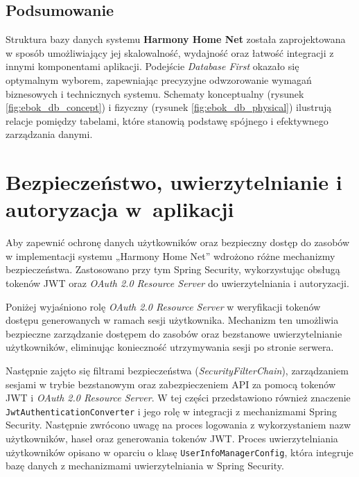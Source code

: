 \subsection{Podsumowanie}

Struktura bazy danych systemu \textbf{Harmony Home Net} została zaprojektowana w sposób umożliwiający jej skalowalność, wydajność oraz łatwość integracji z innymi komponentami aplikacji. Podejście \emph{Database First} okazało się optymalnym wyborem, zapewniając precyzyjne odwzorowanie wymagań biznesowych i technicznych systemu. Schematy konceptualny (rysunek \ref{fig:ebok_db_concept}) i fizyczny (rysunek \ref{fig:ebok_db_physical}) ilustrują relacje pomiędzy tabelami, które stanowią podstawę spójnego i efektywnego zarządzania danymi.

\section{Bezpieczeństwo, uwierzytelnianie i autoryzacja w~aplikacji}
Aby zapewnić ochronę danych użytkowników oraz bezpieczny dostęp do zasobów w implementacji systemu „Harmony Home Net” wdrożono różne mechanizmy bezpieczeństwa. Zastosowano przy tym Spring Security, wykorzystując obsługą tokenów JWT oraz \emph{OAuth 2.0 Resource Server} do uwierzytelniania i autoryzacji. 

Poniżej wyjaśniono rolę \emph{OAuth 2.0 Resource Server} w weryfikacji tokenów dostępu generowanych w ramach sesji użytkownika. Mechanizm ten umożliwia bezpieczne zarządzanie dostępem do zasobów oraz bezstanowe uwierzytelnianie użytkowników, eliminując konieczność utrzymywania sesji po stronie serwera.

Następnie zajęto się filtrami bezpieczeństwa (\emph{SecurityFilterChain}), zarządzaniem sesjami w trybie bezstanowym oraz zabezpieczeniem API za pomocą tokenów JWT i \emph{OAuth 2.0 Resource Server}. W tej części przedstawiono również znaczenie \texttt{JwtAuthenticationConverter} i jego rolę w integracji z mechanizmami Spring Security. Następnie zwrócono uwagę na proces logowania z wykorzystaniem nazw użytkowników, haseł oraz generowania tokenów JWT. Proces uwierzytelniania użytkowników opisano w oparciu o klasę \texttt{UserInfoManagerConfig}, która integruje bazę danych z mechanizmami uwierzytelniania w Spring Security.

